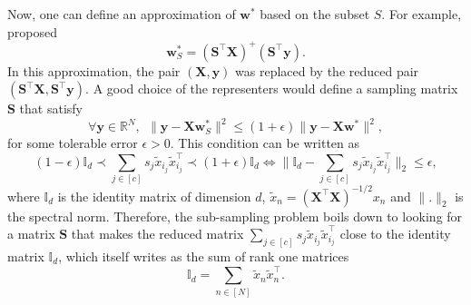 \documentclass[twoside,11pt]{book}
\numberwithin{theorem}{chapter}
\numberwithin{definition}{chapter}
\numberwithin{proposition}{chapter}
\numberwithin{corollary}{chapter}
\numberwithin{example}{chapter}
\numberwithin{lemma}{chapter}
\numberwithin{assumption}{chapter}
\numberwithin{equation}{chapter}
\numberwithin{figure}{chapter}
\DeclareMathOperator{\Tran}{\intercal}
\begin{document}
 Now, one can define an approximation of $\bm{w}^{*}$ based on the subset $S$. For example, \cite*{DrMaMu06} proposed
\begin{equation}
\bm{w}_{S}^{*} = (\bm{S}^{\Tran}\bm{X})^{+} (\bm{S}^{\Tran}\bm{y}).
\end{equation}
In this approximation, the pair $(\bm{X},\bm{y})$ was replaced by the reduced pair $(\bm{S}^{\Tran}\bm{X},\bm{S}^{\Tran}\bm{y})$.
A good choice of the representers would define a sampling matrix $\bm{S}$ that satisfy
\begin{equation}
\forall \bm{y} \in \mathbb{R}^{N}, \:\: \|\bm{y} - \bm{X} \bm{w}_{S}^{*}\|^{2} \leq (1+\epsilon) \|\bm{y} - \bm{X} \bm{w}^{*}\|^{2},
\end{equation}
for some tolerable error $\epsilon >0$. This condition can be written as
\begin{equation}\label{eq:introduction_embedding_condition}
(1-\epsilon) \mathbb{I}_{d} \prec \sum\limits_{j \in [c]} s_{j} \tilde{x}_{i_{j}} \tilde{x}_{i_{j}}^{\Tran} \prec (1+\epsilon) \mathbb{I}_{d} \iff \big \|\mathbb{I}_{d} - \sum\limits_{j \in [c]} s_{j} \tilde{x}_{i_{j}} \tilde{x}_{i_{j}}^{\Tran} \big\|_{2} \leq \epsilon,
\end{equation}
where $\mathbb{I}_{d}$ is the identity matrix of dimension $d$, $\tilde{x}_{n} = (\bm{X}^{\Tran}\bm{X})^{-1/2} x_{n}$ and $\|.\|_{2}$ is the spectral norm.
Therefore, the sub-sampling problem boils down to looking for a matrix $\bm{S}$ that makes the reduced matrix $\sum_{j \in [c]} s_{j} \tilde{x}_{i_{j}} \tilde{x}_{i_{j}}^{\Tran}$ close to the identity matrix $\mathbb{I}_{d}$, which itself writes as the sum of rank one matrices
\begin{equation}\label{eq:sum_to_identity_real}
\mathbb{I}_{d} = \sum\limits_{n \in [N]}\tilde{x}_{n}\tilde{x}_{n}^{\Tran}.
\end{equation}
\end{document}
